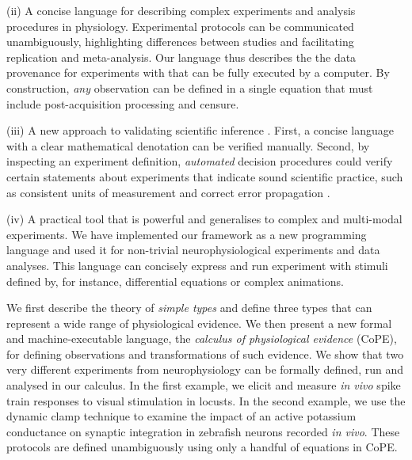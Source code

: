 (ii) A concise language for describing complex experiments and
analysis procedures in physiology. Experimental protocols can be
communicated unambiguously, highlighting differences between studies
and facilitating replication and meta-analysis. Our language thus
describes the the data provenance
\citep{Pool2002,MacKenzie-Graham2008, VanHorn2009} for experiments
with that can be fully executed by a computer. By construction,
\emph{any} observation can be defined in a single equation that must
include post-acquisition processing and censure.

(iii) A new approach to validating scientific inference
\citep{Editors2003, Editors2010}. First, a concise language with a
clear mathematical denotation can be verified manually. Second, by
inspecting an experiment definition, \emph{automated} decision procedures
could verify certain statements about experiments that indicate sound
scientific practice, such as consistent units of measurement
\citep{Kennedy1997} and correct error propagation \citep{Taylor1997}.

(iv) A practical tool that is powerful and generalises to complex and
multi-modal experiments. We have implemented our framework as a new
programming language and used it for non-trivial neurophysiological
experiments and data analyses. This language can concisely express and
run experiment with stimuli defined by, for instance, differential
equations or complex animations.

We first describe the theory of \emph{simple types}
\citep{Pierce2002, Hindley2008} and define three types that can represent a wide
range of physiological evidence. We then present a new formal and
machine-executable language, the \emph{calculus of physiological
  evidence} (CoPE), for defining observations and transformations of
such evidence. We show that two very different experiments from
neurophysiology can be formally defined, run and analysed in our
calculus. In the first example, we elicit and measure \emph{in vivo}
spike train responses to visual stimulation in locusts. In the second
example, we use the dynamic clamp technique to examine the impact of
an active potassium conductance on synaptic integration in zebrafish
neurons recorded \emph{in vivo}. These protocols are defined
unambiguously using only a handful of equations in CoPE.

